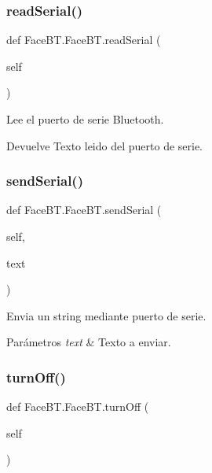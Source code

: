 \subsubsection{\texorpdfstring{read\+Serial()}{readSerial()}}
{\footnotesize\ttfamily def Face\+B\+T.\+Face\+B\+T.\+read\+Serial (\begin{DoxyParamCaption}\item[{}]{self }\end{DoxyParamCaption})}



Lee el puerto de serie Bluetooth. 

\begin{DoxyReturn}{Devuelve}
Texto leido del puerto de serie. 
\end{DoxyReturn}
\mbox{\label{class_face_b_t_1_1_face_b_t_a6f362adf4c828653782877a661b4714d}} 
\subsubsection{\texorpdfstring{send\+Serial()}{sendSerial()}}
{\footnotesize\ttfamily def Face\+B\+T.\+Face\+B\+T.\+send\+Serial (\begin{DoxyParamCaption}\item[{}]{self,  }\item[{}]{text }\end{DoxyParamCaption})}



Envia un string mediante puerto de serie. 


\begin{DoxyParams}{Parámetros}
{\em text} & Texto a enviar. \\
\hline
\end{DoxyParams}
\mbox{\label{class_face_b_t_1_1_face_b_t_a4ca8c746966a8a3716113db50b0ce01d}} 
\subsubsection{\texorpdfstring{turn\+Off()}{turnOff()}}
{\footnotesize\ttfamily def Face\+B\+T.\+Face\+B\+T.\+turn\+Off (\begin{DoxyParamCaption}\item[{}]{self }\end{DoxyParamCaption})}



